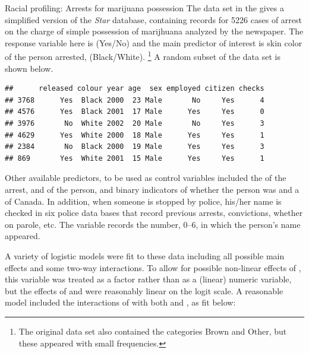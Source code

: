 \documentclass[11pt]{book}
\renewenvironment{knitrout}{\small\renewcommand{\baselinestretch}{.85}}{} %
\begin{document}
\begin{Example}[arrests]{Racial profiling: Arrests for marijuana possession}
The data set  in the  gives a simplified version
of the \emph{Star} database, containing 
records for 5226 cases of arrest on the charge of simple
possession of marijhuana analyzed by the newspaper.
The response variable here is  (Yes/No)
and the main
predictor of interest is skin color of the person arrested, 
(Black/White).%
\footnote{
The original data set also contained the categories Brown and Other,
but these appeared with small frequencies.
}
A random subset of the data set is shown below.

\begin{knitrout}
\color{fgcolor}\begin{kframe}
\begin{alltt}
\hlstd{(}\hlstd{,} \hlstd{=}\hlstd{)}
\hlstd{Arrests[}\hlstd{(} \hlstd{),]}
\end{alltt}
\begin{verbatim}
##      released colour year age  sex employed citizen checks
## 3768      Yes  Black 2000  23 Male       No     Yes      4
## 4576      Yes  Black 2001  17 Male      Yes     Yes      0
## 3976       No  White 2002  20 Male       No     Yes      3
## 4629      Yes  White 2000  18 Male      Yes     Yes      1
## 2384       No  Black 2000  19 Male      Yes     Yes      3
## 869       Yes  White 2001  15 Male      Yes     Yes      1
\end{verbatim}
\end{kframe}
\end{knitrout}
Other available predictors, to be used as control variables included
the  of the arrest,  and  of the person, and binary indicators
of whether the person was  and a  of Canada.
In addition, when someone is stopped by police, his/her name is checked in six police
data bases that record previous arrests, convictions, whether on parole, etc.
The variable  records the number, 0--6, in which the person's name
appeared.

A variety of logistic models were fit to these data including all possible main effects
and some two-way interactions. To allow for possible non-linear effects of ,
this variable was treated as a factor rather than as a (linear) numeric variable,
but the effects of  and  were reasonably linear on the logit scale.
A reasonable model included the interactions of  with both  and
, as fit below:


\end{Example}
\end{document}
